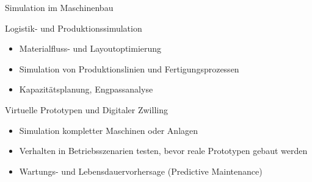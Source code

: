 \documentclass[xelatex,aspectratio=169]{beamer}
\begin{document}
\begin{frame}[allowframebreaks]{Simulation im Maschinenbau}
    \begin{block}{Logistik- und Produktionssimulation}
        \begin{itemize}
            \item Materialfluss- und Layoutoptimierung
            \item Simulation von Produktionslinien und Fertigungsprozessen
            \item Kapazitätsplanung, Engpassanalyse
        \end{itemize}
    \end{block}

    \begin{block}{Virtuelle Prototypen und Digitaler Zwilling}
        \begin{itemize}
            \item Simulation kompletter Maschinen oder Anlagen
            \item Verhalten in Betriebsszenarien testen, bevor reale Prototypen gebaut werden
            \item Wartungs- und Lebensdauervorhersage (Predictive Maintenance)
        \end{itemize}
    \end{block}

\end{frame}
\end{document}
